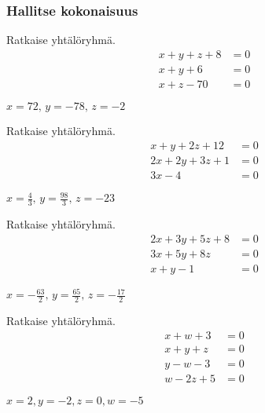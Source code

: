 \begin{tehtavasivu}
\subsubsection*{Hallitse kokonaisuus}

\begin{tehtava}
    Ratkaise yhtälöryhmä.
    \begin{align*}
        x+y+z+8 &= 0 \\
        x+y+6 &=0 \\
        x+z-70 &=0
    \end{align*}
    \begin{vastaus}
        $x = 72, \, y = -78, \, z = -2$
    \end{vastaus}
\end{tehtava}

\begin{tehtava}
    Ratkaise yhtälöryhmä.
    \begin{align*}
        x+y+2z+12 &= 0 \\
        2x+2y+3z+1 &=0 \\
        3x-4 &=0
    \end{align*}
    \begin{vastaus}
        $x = \frac{4}{3}, \, y = \frac{98}{3}, \, z = -23$
    \end{vastaus}
\end{tehtava}

\begin{tehtava}
    Ratkaise yhtälöryhmä.
    \begin{align*}
        2x+3y+5z+8 &= 0 \\
        3x+5y+8z &=0 \\
        x+y-1 &=0
    \end{align*}
    \begin{vastaus}
        $x = -\frac{63}{2}, \, y = \frac{65}{2}, \, z = -\frac{17}{2}$
    \end{vastaus}
\end{tehtava}

\begin{tehtava}
	Ratkaise yhtälöryhmä.
	\begin{align*}
		x+w+3 &= 0 \\
		x+y+z &= 0 \\
		y-w-3 &= 0 \\
		w-2z+5 &= 0
	\end{align*}
	\begin{vastaus}
		$x=2, y=-2, z=0, w=-5$
	\end{vastaus}
\end{tehtava}



\end{tehtavasivu}
